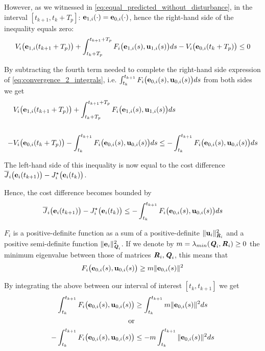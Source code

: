 \begin{gg_box}
  However, as we witnessed in \eqref{eq:equal_predicted_without_disturbance},
  in the interval $[t_{k+1}, t_k + T_p]$:
  $\bm{\mathbf{e}}_{1,i}(\cdot) = \bm{\mathbf{e}}_{0,i}(\cdot)$, hence the right-hand
  side of the inequality equals zero:
  \begin{align}
    V_i\big(\bm{\mathbf{e}}_{1,i}(t_{k+1} + T_p)\big)
    + \int_{t_k + T_p}^{t_{k+1} + T_p} F_i\big(\bm{\mathbf{e}}_{1,i}(s), \bm{\mathbf{u}}_{1,i}(s)\big) ds
    - V_i\big(\bm{\mathbf{e}}_{0,i}(t_k + T_p)\big) \leq 0
  \end{align}

  By subtracting the fourth term needed to complete the right-hand side
  expression of \eqref{eq:convergence_2_integrals}, i.e.
  $\int_{t_k}^{t_{k+1}} F_i \big(\bm{\mathbf{e}}_{0,i}(s), \bm{\mathbf{u}}_{0,i} (s)\big) d s$
  from both sides we get
  \begin{align}
    &V_i\big(\bm{\mathbf{e}}_{1,i}(t_{k+1} + T_p)\big)
    + \int_{t_k + T_p}^{t_{k+1} + T_p} F_i\big(\bm{\mathbf{e}}_{1,i}(s), \bm{\mathbf{u}}_{1,i}(s)\big) ds \\\\
    - &V_i\big(\bm{\mathbf{e}}_{0,i}(t_k + T_p)\big)
    -\int_{t_k}^{t_{k+1}} F_i \big(\bm{\mathbf{e}}_{0,i}(s), \bm{\mathbf{u}}_{0,i} (s)\big) d s
    \leq -\int_{t_k}^{t_{k+1}} F_i \big(\bm{\mathbf{e}}_{0,i}(s), \bm{\mathbf{u}}_{0,i} (s)\big) d s
  \end{align}

  The left-hand side of this inequality is now equal to the cost difference
  $\overline{J}_i\big(\bm{\mathbf{e}}_i(t_{k+1})\big) - J_i^{\star}\big(\bm{\mathbf{e}}_i(t_k)\big)$.
\end{gg_box}
Hence, the cost difference becomes bounded by
\begin{align}
  \overline{J}_i\big(\bm{\mathbf{e}}_i(t_{k+1})\big) - J_i^{\star}\big(\bm{\mathbf{e}}_i(t_k)\big) \leq
    -\int_{t_k}^{t_{k+1}} F_i \big(\bm{\mathbf{e}}_{0,i}(s), \bm{\mathbf{u}}_{0,i} (s)\big) ds
\end{align}
\begin{gg_box}
  $F_i$ is a positive-definite function as a sum of a positive-definite
  $\|\bm{\mathbf{u}}_i\|^2_{\bm{\mathit{R}}_i}$ and a positive semi-definite function
  $\|\bm{\mathbf{e}}_i\|^2_{\bm{\mathit{Q}}_i}$. If we denote by
  $m = \lambda_{min}(\bm{\mathit{Q}}_i, \bm{\mathit{R}}_i) \geq 0$ the minimum eigenvalue
  between those of matrices $\bm{\mathit{R}}_i, \bm{\mathit{Q}}_i$, this means that
  \begin{align}
    F_i \big(\bm{\mathbf{e}}_{0,i}(s), \bm{\mathbf{u}}_{0,i} (s)\big) \geq m \|\bm{\mathbf{e}}_{0,i}(s)\|^2
  \end{align}

  By integrating the above between our interval of interest $[t_k, t_{k+1}]$ we get
  \begin{align}
    \int_{t_k}^{t_{k+1}} F_i \big(\bm{\mathbf{e}}_{0,i}(s), \bm{\mathbf{u}}_{0,i} (s)\big) &\geq \int_{t_k}^{t_{k+1}} m \|\bm{\mathbf{e}}_{0,i}(s)\|^2 ds \\
    \text{or}\\
    -\int_{t_k}^{t_{k+1}} F_i \big(\bm{\mathbf{e}}_{0,i}(s), \bm{\mathbf{u}}_{0,i} (s)\big) &\leq -m \int_{t_k}^{t_{k+1}} \|\bm{\mathbf{e}}_{0,i}(s)\|^2 ds
  \end{align}
\end{gg_box}

